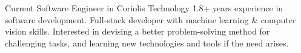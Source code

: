 

\begin{cvparagraph}

Current Software Engineer in Coriolis Technology 1.8+ years experience in software development. Full-stack developer with machine learning \& computer vision skills. Interested in devising a better problem-solving method for challenging tasks, and learning new technologies and tools if the need arises.
\end{cvparagraph}
